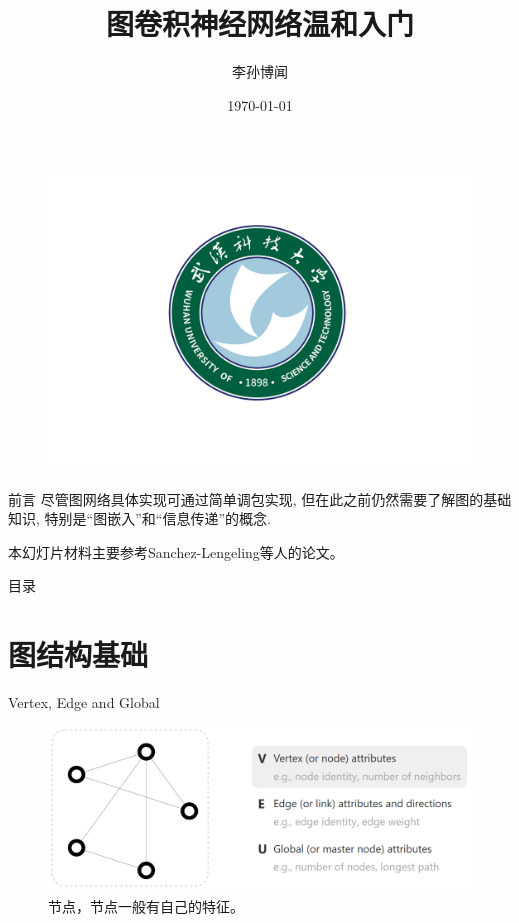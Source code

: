 \documentclass{beamer}
\author[Sunbowen Lee]{李孙博闻}
\title[Graph neural network]{图卷积神经网络温和入门}
\institute{武汉科技大学 \\ 理学院 \\ 冶金工业过程系统科学湖北省重点实验室}
\date{\today}
\begin{document}
\songti %
\setsansfont{Times New Roman} %

\begin{frame}  %
    \titlepage
    \begin{figure}[htpb]
        \centering
        \vspace{-0.7cm}
        \includegraphics[width=0.45\linewidth]{wust.png}
    \end{figure}
\end{frame}

\begin{frame}{前言}
    尽管图网络具体实现可通过简单调包实现, 但在此之前仍然需要了解图的基础知识, 特别是``图嵌入''和``信息传递''的概念. \newline

    本幻灯片材料主要参考Sanchez-Lengeling\cite{sanchez-lengeling2021a}等人的论文。
\end{frame}

\begin{frame}{目录}\small
    \tableofcontents[subsectionstyle=hide]
\end{frame}

\AtBeginSubsection[]{
    \begin{frame}
        \tableofcontents[currentsubsection]
    \end{frame}
}

\section{图结构基础}


\begin{frame}{Vertex, Edge and Global}
    \begin{figure}
        \includegraphics[width=\textwidth]{vertex.png}
        \caption{节点，节点一般有自己的特征。}
    \end{figure}
\end{frame}
\end{document}
